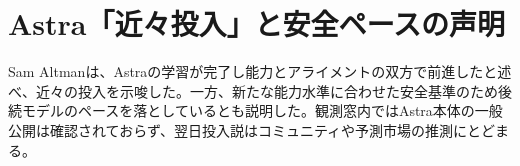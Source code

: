 \section{Astra「近々投入」と安全ペースの声明}
Sam Altmanは、Astraの学習が完了し能力とアライメントの双方で前進したと述べ、近々の投入を示唆した。一方、新たな能力水準に合わせた安全基準のため後続モデルのペースを落としているとも説明した。観測窓内ではAstra本体の一般公開は確認されておらず、翌日投入説はコミュニティや予測市場の推測にとどまる。

